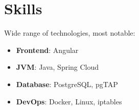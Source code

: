 \section*{Skills}
{ %
  Wide range of technologies, most notable:

  \begin{itemize}
    \item \textbf{Frontend}: Angular
    \item \textbf{JVM}: Java, Spring Cloud
    \item \textbf{Database}: PostgreSQL, pgTAP
    \item \textbf{DevOps}: Docker, Linux, iptables
  \end{itemize}
}
